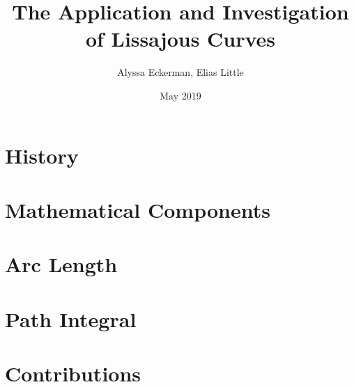 \documentclass{article}
\title{The Application and Investigation of Lissajous Curves}
\author{Alyssa Eckerman, Elias Little}
\date{May 2019}
\begin{document}
\maketitle
\section{History}

\newpage
\section{Mathematical Components}

\newpage
\section{Arc Length}

\newpage
\section{Path Integral}

\newpage
\section{Contributions}

\end{document}
